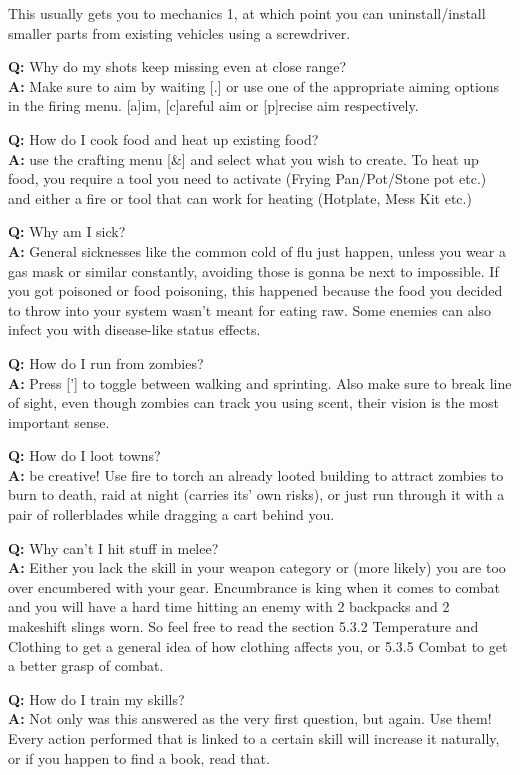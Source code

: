 \documentclass[11pt]{report}
\begin{document}
This usually gets you to mechanics 1, at which point you can uninstall/install smaller parts from existing vehicles using a screwdriver.

\textbf{Q:} Why do my shots keep missing even at close range?\\
\textbf{A:} Make sure to aim by waiting [.] or use one of the appropriate aiming options in the firing menu. [a]im, [c]areful aim or [p]recise aim respectively.

\textbf{Q:} How do I cook food and heat up existing food?\\
\textbf{A:} use the crafting menu [\&] and select what you wish to create. To heat up food, you require a tool you need to activate (Frying Pan/Pot/Stone pot etc.) and either a fire or tool that can work for heating (Hotplate, Mess Kit etc.)

\textbf{Q:} Why am I sick?\\
\textbf{A:} General sicknesses like the common cold of flu just happen, unless you wear a gas mask or similar constantly, avoiding those is gonna be next to impossible. If you got poisoned or food poisoning, this happened because the food you decided to throw into your system wasn't meant for eating raw. Some enemies can also infect you with disease-like status effects.

\textbf{Q:} How do I run from zombies?\\
\textbf{A:} Press ['] to toggle between walking and sprinting. Also make sure to break line of sight, even though zombies can track you using scent, their vision is the most important sense.

\textbf{Q:} How do I loot towns?\\
\textbf{A:} be creative! Use fire to torch an already looted building to attract zombies to burn to death, raid at night (carries its' own risks), or just run through it with a pair of rollerblades while dragging a cart behind you.

\textbf{Q:} Why can't I hit stuff in melee?\\
\textbf{A:} Either you lack the skill in your weapon category or (more likely) you are too over encumbered with your gear. Encumbrance is king when it comes to combat and you will have a hard time hitting an enemy with 2 backpacks and 2 makeshift slings worn. So feel free to read the section 5.3.2 Temperature and Clothing to get a general idea of how clothing affects you, or 5.3.5 Combat to get a better grasp of combat.

\textbf{Q:} How do I train my skills?\\
\textbf{A:} Not only was this answered as the very first question, but again. Use them! Every action performed that is linked to a certain skill will increase it naturally, or if you happen to find a book, read that.
\end{document}
